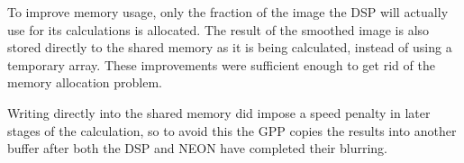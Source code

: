 To improve memory usage, only the fraction of the image the DSP will actually use for its calculations is allocated. The result of the smoothed image is also stored directly to the shared memory as it is being calculated, instead of using a temporary array. These improvements were sufficient enough to get rid of the memory allocation problem.

Writing directly into the shared memory did impose a speed penalty in later stages of the calculation, so to avoid this the GPP copies the results into another buffer after both the DSP and NEON have completed their blurring.